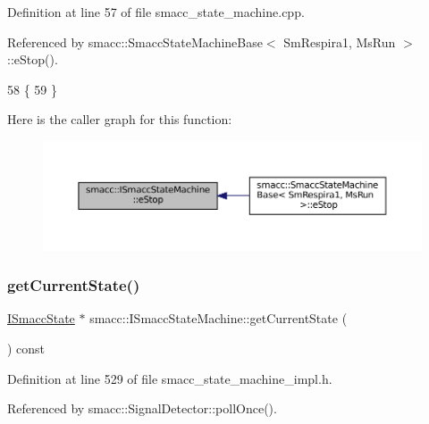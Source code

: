 Definition at line 57 of file smacc\+\_\+state\+\_\+machine.\+cpp.



Referenced by smacc\+::\+Smacc\+State\+Machine\+Base$<$ Sm\+Respira1, Ms\+Run $>$\+::e\+Stop().


\begin{DoxyCode}
58 \{
59 \}
\end{DoxyCode}
Here is the caller graph for this function\+:
\nopagebreak
\begin{figure}[H]
\begin{center}
\leavevmode
\includegraphics[width=350pt]{classsmacc_1_1ISmaccStateMachine_a66a2900be8629748dab7a5c5ab6ae94e_icgraph}
\end{center}
\end{figure}
\mbox{\label{classsmacc_1_1ISmaccStateMachine_a610d09dc5341fb63732be713c21fbe86}} 
\subsubsection{\texorpdfstring{get\+Current\+State()}{getCurrentState()}}
{\footnotesize\ttfamily \hyperlink{classsmacc_1_1ISmaccState}{I\+Smacc\+State} $\ast$ smacc\+::\+I\+Smacc\+State\+Machine\+::get\+Current\+State (\begin{DoxyParamCaption}{ }\end{DoxyParamCaption}) const\hspace{0.3cm}{\ttfamily [inline]}}



Definition at line 529 of file smacc\+\_\+state\+\_\+machine\+\_\+impl.\+h.



Referenced by smacc\+::\+Signal\+Detector\+::poll\+Once().


